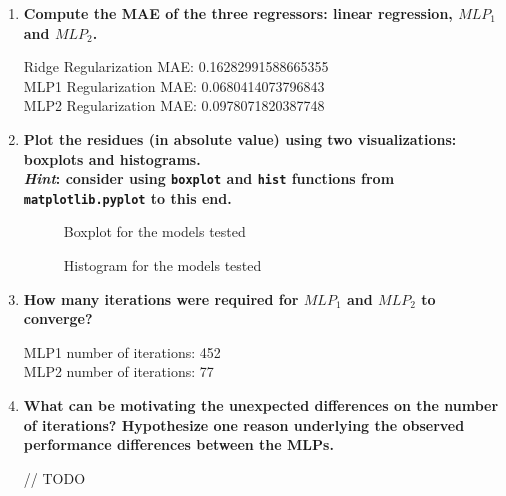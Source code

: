 \documentclass[12pt]{article}
\begin{document}
\begin{enumerate}[leftmargin=\labelsep,resume]
    \item {\color{questioncolor}\bfseries
          Compute the MAE of the three regressors: linear regression, $MLP_1$ and $MLP_2$.
          }\\
          \vspace{0.5em}

          Ridge Regularization MAE: 0.16282991588665355\\
          MLP1 Regularization MAE: 0.0680414073796843\\
          MLP2 Regularization MAE: 0.0978071820387748


    \item {\color{questioncolor}\bfseries
          Plot the residues (in absolute value) using two visualizations: boxplots
          and histograms.\\
          \textit{Hint}: consider using \texttt{boxplot} and \texttt{hist} functions
          from \texttt{matplotlib.pyplot} to this end.
          }\\
          \vspace{0.5em}

          \begin{figure}[H]
            \centering
            
            \caption{Boxplot for the models tested}
            \label{fig:bloxplot}
        \end{figure}

        \begin{figure}[H]
            \centering
            
            \caption{Histogram for the models tested}
            \label{fig:histogram}
        \end{figure}

    \item {\color{questioncolor}\bfseries
          How many iterations were required for $MLP_1$ and $MLP_2$ to converge?
          }\\
          \vspace{0.5em}

          MLP1 number of iterations: 452\\
          MLP2 number of iterations: 77
          
          \item {\color{questioncolor}\bfseries
          What can be motivating the unexpected differences on the number of iterations?
          Hypothesize one reason underlying the observed performance differences between the MLPs.
          }\\
          \vspace{0.5em}

          // TODO

\end{enumerate}
\end{document}
